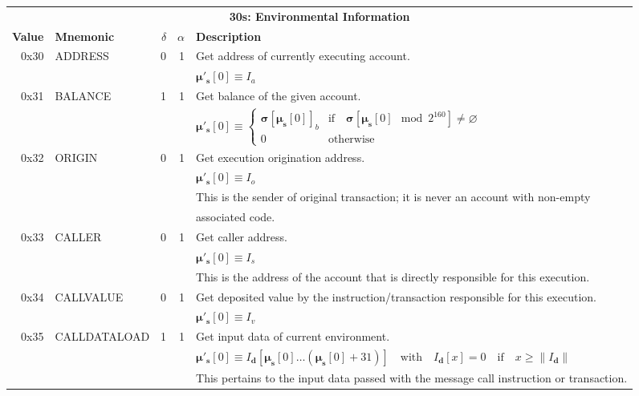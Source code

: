 \documentclass[9pt,oneside]{amsart}
\begin{document}
\begin{tabular*}{\columnwidth}[h]{rlrrl}
\toprule
\multicolumn{5}{c}{\textbf{30s: Environmental Information}} \vspace{5pt} \\
\textbf{Value} & \textbf{Mnemonic} & $\delta$ & $\alpha$ & \textbf{Description} \vspace{5pt} \\
0x30 & {\small ADDRESS} & 0 & 1 & Get address of currently executing account. \\
&&&& $\boldsymbol{\mu}'_\mathbf{s}[0] \equiv I_a$ \\
\midrule
0x31 & {\small BALANCE} & 1 & 1 & Get balance of the given account. \\
&&&& $\boldsymbol{\mu}'_\mathbf{s}[0] \equiv \begin{cases}\boldsymbol{\sigma}[\boldsymbol{\mu}_\mathbf{s}[0]]_b& \text{if} \quad \boldsymbol{\sigma}[\boldsymbol{\mu}_\mathbf{s}[0] \mod 2^{160}] \neq \varnothing\\0&\text{otherwise}\end{cases}$ \\
\midrule
0x32 & {\small ORIGIN} & 0 & 1 & Get execution origination address. \\
&&&& $\boldsymbol{\mu}'_\mathbf{s}[0] \equiv I_o$ \\
&&&& This is the sender of original transaction; it is never an account with non-empty \\
&&&& associated code. \\
\midrule
0x33 & {\small CALLER} & 0 & 1 & Get caller address. \\
&&&& $\boldsymbol{\mu}'_\mathbf{s}[0] \equiv I_s$ \\
&&&& This is the address of the account that is directly responsible for this execution. \\
\midrule
0x34 & {\small CALLVALUE} & 0 & 1 & Get deposited value by the instruction/transaction responsible for this execution. \\
&&&& $\boldsymbol{\mu}'_\mathbf{s}[0] \equiv I_v$ \\
\midrule
0x35 & {\small CALLDATALOAD} & 1 & 1 & Get input data of current environment. \\
&&&& $\boldsymbol{\mu}'_\mathbf{s}[0] \equiv I_\mathbf{d}[ \boldsymbol{\mu}_\mathbf{s}[0] \dots (\boldsymbol{\mu}_\mathbf{s}[0] + 31) ] \quad \text{with} \quad I_\mathbf{d}[x] = 0 \quad \text{if} \quad x \geqslant \lVert I_\mathbf{d} \rVert$ \\
&&&& This pertains to the input data passed with the message call instruction or transaction. \\

\end{tabular*}
\end{document}
